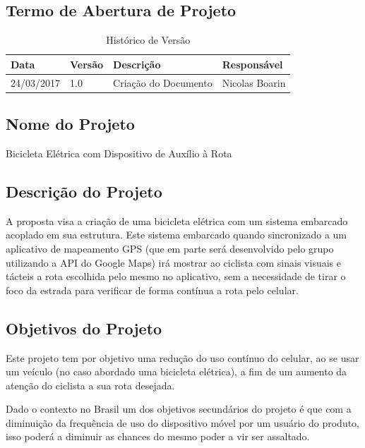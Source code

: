 \begin{apendicesenv}
\partapendices

\chapter{Termo de Abertura de Projeto}
\label{project_charter}

\begin{table}[h!]
\centering
\caption{Histórico de Versão}
\label{my-label}
\begin{tabular}{|l|l|l|l|}
\hline
\textbf{Data} & \textbf{Versão} & \textbf{Descrição}   & \textbf{Responsável} \\ \hline
24/03/2017    & 1.0             & Criação do Documento & Nicolas Boarin       \\ \hline
\end{tabular}
\end{table}

\section{Nome do Projeto}
Bicicleta Elétrica com Dispositivo de Auxílio à Rota

\section{Descrição do Projeto}
A proposta visa a criação de uma bicicleta elétrica com um sistema embarcado acoplado em sua estrutura. Este sistema embarcado quando sincronizado a um aplicativo de mapeamento GPS (que em parte será desenvolvido pelo grupo utilizando a API do Google Maps) irá mostrar ao ciclista com sinais visuais e tácteis a rota escolhida pelo mesmo no aplicativo, sem a necessidade de tirar o foco da estrada para verificar de forma contínua a rota pelo celular.

\section{Objetivos do Projeto}
Este projeto tem por objetivo uma redução do uso contínuo do celular, ao se usar um veículo (no caso abordado uma bicicleta elétrica),  a fim de um aumento da atenção do ciclista a sua rota desejada.

Dado o contexto no Brasil um dos objetivos secundários do projeto é que com a diminuição da frequência de uso do dispositivo móvel por um usuário do produto, isso poderá a diminuir as chances do mesmo poder a vir ser assaltado.


\end{apendicesenv}
